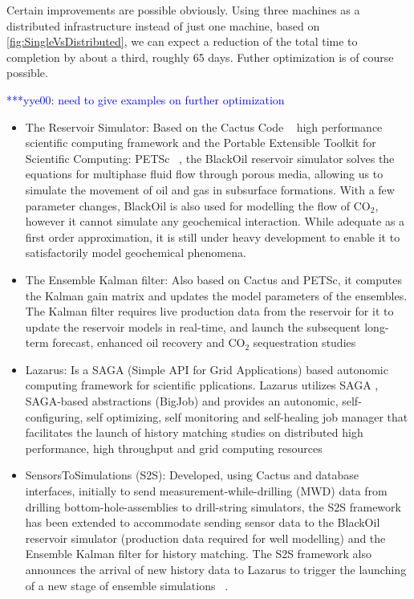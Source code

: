 \documentclass{rspublic}
\newcommand{\yyenote}[1]{ {\textcolor{blue} { ***yye00: #1 }}}
\newcommand{\yyenote}[1]{}
\begin{document}
Certain improvements are possible obviously. Using three machines as a distributed infrastructure instead of just one machine, based on \ref{fig:SingleVsDistributed}, we can expect a reduction of the total time to completion by about a third, roughly 65 days. Futher optimization is of course possible.

\yyenote{need to give examples on further optimization}	






\begin{itemize}

\item The Reservoir Simulator: Based on the Cactus Code
  ~\citep{cactus_web} high performance scientific computing framework
  and the Portable Extensible Toolkit for Scientific Computing: PETSc
  ~\citep{PETSc}, the BlackOil reservoir simulator solves the
  equations for multiphase fluid flow through porous media, allowing
  us to simulate the movement of oil and gas in subsurface
  formations. With a few parameter changes, BlackOil is also used for
  modelling the flow of CO$_2$, however it cannot simulate any
  geochemical interaction. While adequate as a first order
  approximation, it is still under heavy development to enable it to
  satisfactorily model geochemical phenomena.

\item The Ensemble Kalman filter: Also based on Cactus and PETSc, it
  computes the Kalman gain matrix and updates the model parameters of
  the ensembles. The Kalman filter requires live production data from
  the reservoir for it to update the reservoir models in real-time,
  and launch the subsequent long-term forecast, enhanced oil recovery
  and CO$_2$ sequestration studies

\item Lazarus: Is a SAGA (Simple API for Grid Applications) based
  autonomic computing framework for scientific pplications. Lazarus
  utilizes SAGA , SAGA-based abstractions (BigJob) and provides an
  autonomic, self-configuring, self optimizing, self monitoring and
  self-healing job manager that facilitates the launch of history
  matching studies on distributed high performance, high throughput
  and grid computing resources ~\citep{gmac}

\item SensorsToSimulations (S2S): Developed, using Cactus and database
  interfaces, initially to send measurement-while-drilling (MWD) data
  from drilling bottom-hole-assemblies to drill-string simulators, the
  S2S framework has been extended to accommodate sending sensor data
  to the BlackOil reservoir simulator (production data required for
  well modelling) and the Ensemble Kalman filter for history
  matching. The S2S framework also announces the arrival of new
  history data to Lazarus to trigger the launching of a new stage of
  ensemble simulations ~\citep{Duff1,Duff2}.

\end{itemize}
\end{document}
